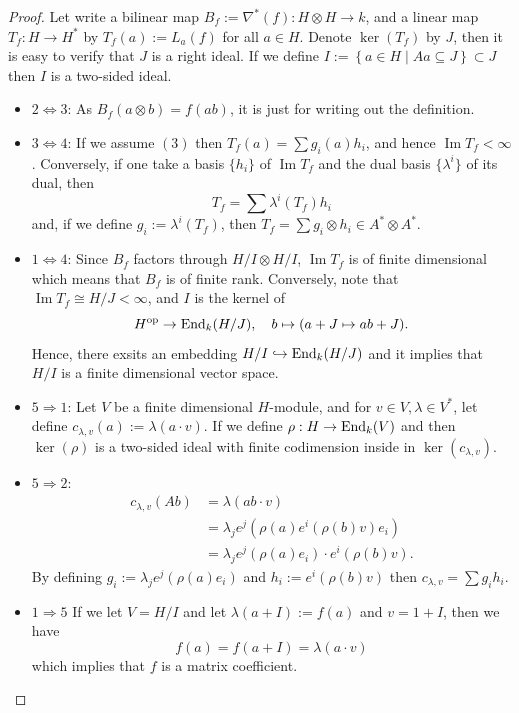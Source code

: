 \begin{proof}
    Let write a bilinear map $B_f := \nabla^*(f): H \otimes H \rightarrow k$, and a linear map $T_f :H \rightarrow H^*$ by $T_f(a) := L_a(f)$ for all $a \in H$. 
    Denote $\ker(T_f)$ by $J$, then it is easy to verify that $J$ is a right ideal.
    If we define $I := \left\{ a \in H \middle| Aa \subseteq J \right\} \subset J$ then $I$ is a two-sided ideal.
    \begin{itemize}
        \item $ 2 \Leftrightarrow 3$: As $B_f(a \otimes b) = f(ab)$, it is just for writing out the definition.
        \item $ 3 \Leftrightarrow 4$: If we assume $(3)$ then $T_f(a) = \sum g_i(a) h_i$, and hence $\operatorname{Im}T_f < \infty$.
        Conversely, if one take a basis $\{ h_i \}$ of $\operatorname{Im}T_f$ and the dual basis $\{\lambda^i \}$ of its dual, then 
        \[
        T_f = \sum \lambda^i (T_f) h_i
        \]
        and, if we define $g_i := \lambda^i(T_f)$, then $T_f = \sum g_i \otimes h_i \in A^* \otimes A^*$.
        \item $ 1 \Leftrightarrow 4$: Since $B_f$ factors through $H/I \otimes H/I$, $\operatorname{Im}T_f$ is of finite dimensional which means that $B_f$ is of finite rank.
        Conversely, note that $\operatorname{Im}T_f \cong H/J < \infty$, and $I$ is the kernel of
        \[
        H^{\text{op}} \rightarrow \operatorname{End}_k(H/J), \quad b \mapsto (a+J \mapsto ab+J).
        \]
        Hence, there exsits an embedding $H/I \hookrightarrow \operatorname{End}_k(H/J)$ and it implies that $H/I$ is a finite dimensional vector space.
        \item $ 5 \Rightarrow 1$: Let $V$ be a finite dimensional $H$-module, and for $v \in V, \lambda \in V^*$, let define $c_{\lambda, v}(a) := \lambda(a \cdot v)$.
        If we define $\rho: H \rightarrow \operatorname{End}_k(V)$ and then $\ker(\rho)$ is a two-sided ideal with finite codimension inside in $\ker(c_{\lambda, v})$.
        \item $ 5 \Rightarrow 2$:
        \begin{align*}
            c_{\lambda, v}(Ab) & = \lambda(ab \cdot v) \\
            & = \lambda_j e^j (\rho(a) e^i(\rho(b)v)e_i) \\
            & = \lambda_j e^j(\rho(a)e_i) \cdot e^i(\rho(b)v).
        \end{align*}
        By defining $g_i := \lambda_j e^j(\rho(a)e_i)$ and $h_i := e^i(\rho(b)v)$ then $c_{\lambda,v} = \sum g_i h_i$.
        \item $ 1 \Rightarrow 5$ If we let $V = H / I$ and let $\lambda(a+I):=f(a)$ and $v = 1 + I$, then we have
        \[
            f(a) = f(a + I) = \lambda(a \cdot v)
        \]
        which implies that $f$ is a matrix coefficient.
    \end{itemize}
\end{proof}

